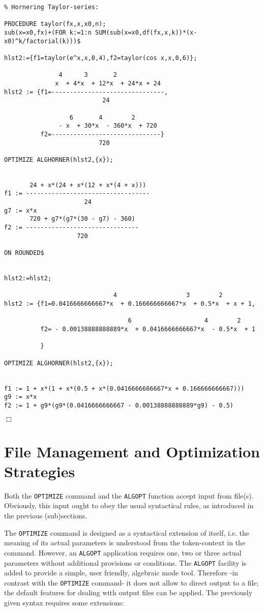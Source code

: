 {\small
\begin{verbatim}
% Hornering Taylor-series:

PROCEDURE taylor(fx,x,x0,n);
sub(x=x0,fx)+(FOR k:=1:n SUM(sub(x=x0,df(fx,x,k))*(x-x0)^k/factorial(k)))$

hlst2:={f1=taylor(e^x,x,0,4),f2=taylor(cos x,x,0,6)};

               4      3       2
              x  + 4*x  + 12*x  + 24*x + 24
hlst2 := {f1=-------------------------------,
                           24

                  6       4        2
               - x  + 30*x  - 360*x  + 720
          f2=------------------------------}
                          720

OPTIMIZE ALGHORNER(hlst2,{x});


       24 + x*(24 + x*(12 + x*(4 + x)))
f1 := ----------------------------------
                      24
g7 := x*x
       720 + g7*(g7*(30 - g7) - 360)
f2 := -------------------------------
                    720

ON ROUNDED$


hlst2:=hlst2;

                              4                   3        2
hlst2 := {f1=0.0416666666667*x  + 0.166666666667*x  + 0.5*x  + x + 1,

                                  6                    4        2
          f2= - 0.00138888888889*x  + 0.0416666666667*x  - 0.5*x  + 1

          }

OPTIMIZE ALGHORNER(hlst2,{x});


f1 := 1 + x*(1 + x*(0.5 + x*(0.0416666666667*x + 0.166666666667)))
g9 := x*x
f2 := 1 + g9*(g9*(0.0416666666667 - 0.00138888888889*g9) - 0.5)
\end{verbatim}
\begin{flushright}
$\Box$
\end{flushright}}

\newpage
\section{File Management and Optimization Strategies}\label{SCOPE:files}

Both the {\tt OPTIMIZE} command and the {\tt ALGOPT} function accept
input from file(s). Obviously, this input ought to obey the
usual syntactical rules, as introduced in the previous (sub)sections.

The {\tt OPTIMIZE} command is designed as a syntactical extension of {\REDUCE}
itself, i.e. the meaning of its actual parameters is understood from the
token-context in the command. However, an {\tt ALGOPT}
application requires one, two or three actual parameters without additional
provisions or conditions.
The {\tt ALGOPT} facility is added to provide a simple, user friendly,
algebraic mode tool. Therefore -in contrast with the {\tt OPTIMIZE} command-
it does not allow to direct output to a file; the default {\REDUCE} features
for dealing with output files can be applied.
The previously given syntax requires some extensions:

